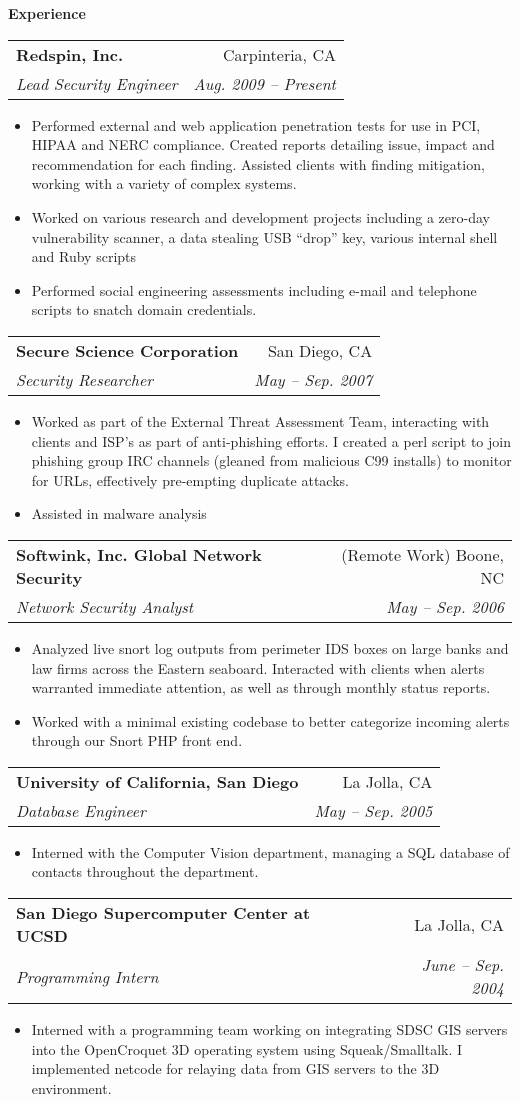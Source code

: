 \documentclass[letterpaper,11pt]{article}
\makeatletter
\newcommand{\resitem}[1]{\item #1 \vspace{-2pt}}
\newcommand{\resheading}[1]{{\large \colorbox{mygrey}{\begin{minipage}{\textwidth}{\textbf{#1 \vphantom{p\^{E}}}}\end{minipage}}}}
\newcommand{\ressubheading}[4]{
\begin{tabular*}{6.5in}{l@{\extracolsep{\fill}}r}
		\textbf{#1} & #2 \\
		\textit{#3} & \textit{#4} \\
\end{tabular*}\vspace{-6pt}}
\makeatother
\begin{document}
\resheading{Experience}
	\begin{description}
	\item\ressubheading{{Redspin, Inc.}}{Carpinteria, CA}{Lead Security Engineer}{Aug. 2009 -- Present}
				{ \footnotesize
				\begin{itemize}
					\resitem{Performed external and web application penetration tests for use in PCI, HIPAA and NERC compliance. Created reports detailing issue, impact and recommendation for each finding. Assisted clients with finding mitigation, working with a variety of complex systems.}
					\resitem{Worked on various research and development projects including a zero-day vulnerability scanner, a data stealing USB ``drop'' key, various internal shell and Ruby scripts}
					\resitem{Performed social engineering assessments including e-mail and telephone scripts to snatch domain credentials.}
				\end{itemize}
				}
	\item\ressubheading{{Secure Science Corporation}}{San Diego, CA}{Security Researcher}{May -- Sep. 2007}
				{ \footnotesize
				\begin{itemize}
					\resitem{Worked as part of the External Threat Assessment Team, interacting with clients and ISP's as part of anti-phishing efforts. I created a perl script to join phishing group IRC channels (gleaned from malicious C99 installs) to monitor for URLs, effectively pre-empting duplicate attacks.}
					\resitem{Assisted in malware analysis}
				\end{itemize}
          			}
	\item\ressubheading{{Softwink, Inc. Global Network Security}}{(Remote Work) Boone, NC}{Network Security Analyst}{May -- Sep. 2006}
				{ \footnotesize
				\begin{itemize}
					\resitem{Analyzed live snort log outputs from perimeter IDS boxes on large banks and law firms across the Eastern seaboard. Interacted with clients when alerts warranted immediate attention, as well as through monthly status reports.}
					\resitem{Worked with a minimal existing codebase to better categorize incoming alerts through our Snort PHP front end.}
				\end{itemize}
				}
	\item\ressubheading{{University of California, San Diego}}{La Jolla, CA}{Database Engineer}{May -- Sep. 2005}
				{ \footnotesize
				\begin{itemize}
					\resitem{Interned with the Computer Vision department, managing a SQL database of contacts throughout the department.}
				\end{itemize}
				}
	\item\ressubheading{{San Diego Supercomputer Center at UCSD}}{La Jolla, CA}{Programming Intern}{June -- Sep. 2004}
				{ \footnotesize
				\begin{itemize}
					\resitem{Interned with a programming team working on integrating SDSC GIS servers into the OpenCroquet 3D operating system using Squeak/Smalltalk. I implemented netcode for relaying data from GIS servers to the 3D environment.}
				\end{itemize}
				}
	\end{description}  %
\end{document}
